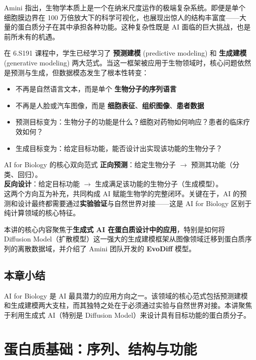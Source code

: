 \documentclass[a4paper]{article}
\begin{document}
Amini 指出，生物学本质上是一个在纳米尺度运作的极端复杂系统。即便是单个细胞膜边界在 100 万倍放大下的科学可视化，也展现出惊人的结构丰富度——大量的蛋白质分子在其中承担各种功能。这种复杂性既是 AI 面临的巨大挑战，也是前所未有的机遇。

在 6.S191 课程中，学生已经学习了 \textbf{预测建模} (predictive modeling) 和 \textbf{生成建模} (generative modeling) 两大范式。当这一框架被应用于生物领域时，核心问题依然是预测与生成，但数据模态发生了根本性转变：

\begin{itemize}
    \item 不再是自然语言文本，而是单个 \textbf{生物分子的序列语言}
    \item 不再是人脸或汽车图像，而是 \textbf{细胞表征}、\textbf{组织图像}、\textbf{患者数据}
    \item 预测目标变为：生物分子的功能是什么？细胞对药物如何响应？患者的临床疗效如何？
    \item 生成目标变为：给定目标功能，能否设计出实现该功能的生物分子？
\end{itemize}

\begin{importantbox}{AI for Biology 的核心双向范式}
\textbf{正向预测}：给定生物分子 $\rightarrow$ 预测其功能（分类、回归）。\\
\textbf{反向设计}：给定目标功能 $\rightarrow$ 生成满足该功能的生物分子（生成模型）。\\
这两个方向互为补充，共同构成 AI 赋能生物学的完整闭环。关键在于，AI 的预测和设计最终都需要通过\textbf{实验验证}与自然世界对接——这是 AI for Biology 区别于纯计算领域的核心特征。
\end{importantbox}

本讲的核心内容聚焦于\textbf{生成式 AI 在蛋白质设计中的应用}，特别是如何将 Diffusion Model（扩散模型）这一强大的生成建模框架从图像领域迁移到蛋白质序列的离散数据域，并介绍了 Amini 团队开发的 \textbf{EvoDiff} 模型。

\subsection{本章小结}

AI for Biology 是 AI 最具潜力的应用方向之一。该领域的核心范式包括预测建模和生成建模两大支柱，而其独特之处在于必须通过实验与自然世界对接。本讲聚焦于利用生成式 AI（特别是 Diffusion Model）来设计具有目标功能的蛋白质分子。


\section{蛋白质基础：序列、结构与功能}
\end{document}
